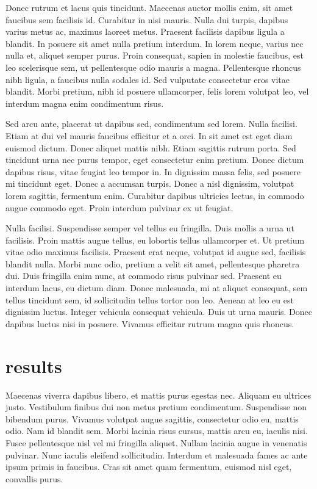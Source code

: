 \documentclass[twocolumn,aps]{revtex4}
\begin{document}
Donec rutrum et lacus quis tincidunt. Maecenas auctor mollis enim, sit amet
faucibus sem facilisis id. Curabitur in nisi mauris. Nulla dui turpis, dapibus
varius metus ac, maximus laoreet metus. Praesent facilisis dapibus ligula a
blandit. In posuere sit amet nulla pretium interdum. In lorem neque, varius nec
nulla et, aliquet semper purus. Proin consequat, sapien in molestie faucibus,
est leo scelerisque sem, ut pellentesque odio mauris a magna. Pellentesque
rhoncus nibh ligula, a faucibus nulla sodales id. Sed vulputate consectetur
eros vitae blandit. Morbi pretium, nibh id posuere ullamcorper, felis lorem
volutpat leo, vel interdum magna enim condimentum risus.

Sed arcu ante, placerat ut dapibus sed, condimentum sed lorem. Nulla facilisi.
Etiam at dui vel mauris faucibus efficitur et a orci. In sit amet est eget diam
euismod dictum. Donec aliquet mattis nibh. Etiam sagittis rutrum porta. Sed
tincidunt urna nec purus tempor, eget consectetur enim pretium. Donec dictum
dapibus risus, vitae feugiat leo tempor in. In dignissim massa felis, sed
posuere mi tincidunt eget. Donec a accumsan turpis. Donec a nisl dignissim,
volutpat lorem sagittis, fermentum enim. Curabitur dapibus ultricies lectus, in
commodo augue commodo eget. Proin interdum pulvinar ex ut feugiat.

Nulla facilisi. Suspendisse semper vel tellus eu fringilla. Duis mollis a urna
ut facilisis. Proin mattis augue tellus, eu lobortis tellus ullamcorper et. Ut
pretium vitae odio maximus facilisis. Praesent erat neque, volutpat id augue
sed, facilisis blandit nulla. Morbi nunc odio, pretium a velit sit amet,
pellentesque pharetra dui. Duis fringilla enim nunc, at commodo risus pulvinar
sed. Praesent eu interdum lacus, eu dictum diam. Donec malesuada, mi at aliquet
consequat, sem tellus tincidunt sem, id sollicitudin tellus tortor non leo.
Aenean at leo eu est dignissim luctus. Integer vehicula consequat vehicula.
Duis ut urna mauris. Donec dapibus luctus nisi in posuere. Vivamus efficitur
rutrum magna quis rhoncus.

\section{results}

Maecenas viverra dapibus libero, et mattis purus egestas nec. Aliquam eu
ultrices justo. Vestibulum finibus dui non metus pretium condimentum.
Suspendisse non bibendum purus. Vivamus volutpat augue sagittis, consectetur
odio eu, mattis odio. Nam id blandit sem. Morbi lacinia risus cursus, mattis
arcu eu, iaculis nisi. Fusce pellentesque nisl vel mi fringilla aliquet. Nullam
lacinia augue in venenatis pulvinar. Nunc iaculis eleifend sollicitudin.
Interdum et malesuada fames ac ante ipsum primis in faucibus. Cras sit amet
quam fermentum, euismod nisl eget, convallis purus.
\end{document}

